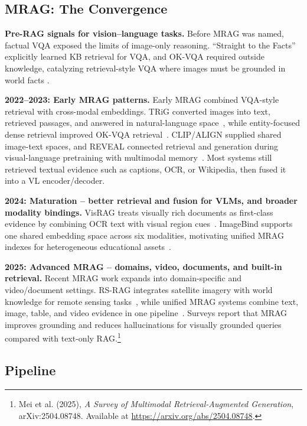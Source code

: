 \subsection{MRAG: The Convergence}
\textbf{Pre-RAG signals for vision–language tasks.}  
Before MRAG was named, factual VQA exposed the limits of image-only reasoning. “Straight to the Facts” explicitly learned KB retrieval for VQA, and OK-VQA required outside knowledge, catalyzing retrieval-style VQA where images must be grounded in world facts \cite{marino2019okvqa}.

\textbf{2022–2023: Early MRAG patterns.}  
Early MRAG combined VQA-style retrieval with cross-modal embeddings. TRiG converted images into text, retrieved passages, and answered in natural-language space~\cite{gao2022trig}, while entity-focused dense retrieval improved OK-VQA retrieval~\cite{wu2022entityvqa}. CLIP/ALIGN supplied shared image-text spaces, and REVEAL connected retrieval and generation during visual-language pretraining with multimodal memory~\cite{hu2023reveal}. Most systems still retrieved textual evidence such as captions, OCR, or Wikipedia, then fused it into a VL encoder/decoder.

\textbf{2024: Maturation – better retrieval and fusion for VLMs, and broader modality bindings.}  
VisRAG treats visually rich documents as first-class evidence by combining OCR text with visual region cues~\cite{yu2024visrag}. ImageBind supports one shared embedding space across six modalities, motivating unified MRAG indexes for heterogeneous educational assets~\cite{girdhar2023imagebind}.

\textbf{2025: Advanced MRAG – domains, video, documents, and built-in retrieval.}  
Recent MRAG work expands into domain-specific and video/document settings. RS-RAG integrates satellite imagery with world knowledge for remote sensing tasks~\cite{wen2025rsrag}, while unified MRAG systems combine text, image, table, and video evidence in one pipeline~\cite{drushchak2025unified}. Surveys report that MRAG improves grounding and reduces hallucinations for visually grounded queries compared with text-only RAG.\footnote{Mei et al. (2025), \emph{A Survey of Multimodal Retrieval-Augmented Generation}, arXiv:2504.08748. Available at \url{https://arxiv.org/abs/2504.08748}.}



\subsection{Pipeline}

